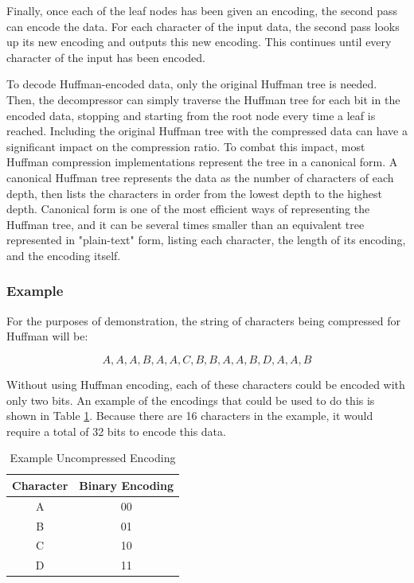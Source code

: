 \documentclass[doublespace,nopageskip]{VTthesis}
\begin{document}
Finally, once each of the leaf nodes has been given an encoding, the second pass can encode the data. For each character of the input data, the second pass looks up its new encoding and outputs this new encoding. This continues until every character of the input has been encoded.

To decode Huffman-encoded data, only the original Huffman tree is needed. Then, the decompressor can simply traverse the Huffman tree for each bit in the encoded data, stopping and starting from the root node every time a leaf is reached. Including the original Huffman tree with the compressed data can have a significant impact on the compression ratio. To combat this impact, most Huffman compression implementations represent the tree in a canonical form. A canonical Huffman tree represents the data as the number of characters of each depth, then lists the characters in order from the lowest depth to the highest depth. Canonical form is one of the most efficient ways of representing the Huffman tree, and it can be several times smaller than an equivalent tree represented in "plain-text" form, listing each character, the length of its encoding, and the encoding itself.

\subsubsection{Example}\label{sss:huffman_example}
For the purposes of demonstration, the string of characters being compressed for Huffman will be:

\[A,A,A,B,A,A,C,B,B,A,A,B,D,A,A,B\]

Without using Huffman encoding, each of these characters could be encoded with only two bits. An example of the encodings that could be used to do this is shown in Table \ref{tab:default_encoding}. Because there are 16 characters in the example, it would require a total of 32 bits to encode this data.

\begin{table}[htb]
	\centering
	\caption{Example Uncompressed Encoding}
	\begin{tabular}{cc}
	    \toprule
	    Character & Binary Encoding\\
	    \midrule
	    A & 00 \\
	    \midrule
	    B & 01 \\
	    \midrule
	    C & 10 \\
	    \midrule
	    D & 11 \\
	    \bottomrule
	\end{tabular}
	\label{tab:default_encoding}
\end{table}
\end{document}
